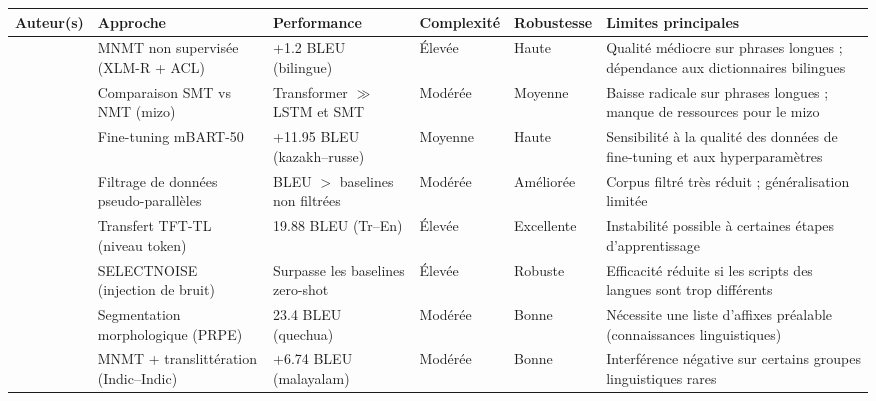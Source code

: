 \begingroup
\renewcommand{\arraystretch}{1.4}
\small
{}
\begin{longtable}{p{2.8cm}p{2.8cm}p{2.2cm}p{1.9cm}p{1.9cm}p{3.2cm}}
\toprule
\textbf{Auteur(s)} & \textbf{Approche} & \textbf{Performance} & \textbf{Complexité} & \textbf{Robustesse} & \textbf{Limites principales} \\
\midrule
\endfirsthead
\endhead

\bottomrule
\endfoot

\bottomrule
\endlastfoot
\citeauthor{ali2026hybrid} \cite{ali2026hybrid} &
\ac{MNMT} non supervisée (XLM-R + ACL) &
+1.2 \ac{BLEU} (bilingue) &
Élevée &
Haute &
Qualité médiocre sur phrases longues ; dépendance aux dictionnaires bilingues \\
\citeauthor{lalrempuii2021improved} \cite{lalrempuii2021improved} &
Comparaison SMT vs NMT (mizo) &
Transformer $\gg$ LSTM et SMT &
Modérée &
Moyenne &
Baisse radicale sur phrases longues ; manque de ressources pour le mizo \\
\citeauthor{rakhimov2024enhancing} \cite{rakhimov2024enhancing} &
Fine-tuning mBART-50 &
+11.95 \ac{BLEU} (kazakh--russe) &
Moyenne &
Haute &
Sensibilité à la qualité des données de fine-tuning et aux hyperparamètres \\
\citeauthor{ahmadnia2021impact} \cite{ahmadnia2021impact} &
Filtrage de données pseudo-parallèles &
BLEU $>$ baselines non filtrées &
Modérée &
Améliorée &
Corpus filtré très réduit ; généralisation limitée \\
\citeauthor{dai2025tfttl} \cite{dai2025tfttl} &
Transfert TFT-TL (niveau token) &
19.88 \ac{BLEU} (Tr--En) &
Élevée &
Excellente &
Instabilité possible à certaines étapes d'apprentissage \\
\citeauthor{brahma2023selectnoise} \cite{brahma2023selectnoise} &
SELECTNOISE (injection de bruit) &
Surpasse les baselines zero-shot &
Élevée &
Robuste &
Efficacité réduite si les scripts des langues sont trop différents \\
\citeauthor{chen-fazio-2021-morphologically} \cite{chen-fazio-2021-morphologically} &
Segmentation morphologique (PRPE) &
23.4 \ac{BLEU} (quechua) &
Modérée &
Bonne &
Nécessite une liste d'affixes préalable (connaissances linguistiques) \\
\citeauthor{bala2024multilingual} \cite{bala2024multilingual} &
MNMT + translittération (Indic--Indic) &
+6.74 \ac{BLEU} (malayalam) &
Modérée &
Bonne &
Interférence négative sur certains groupes linguistiques rares \\

\end{longtable}
